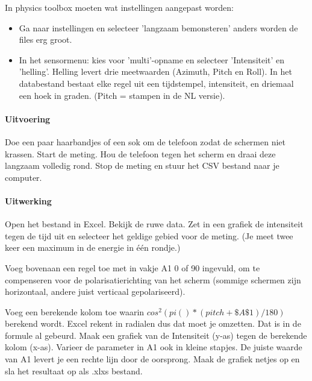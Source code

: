 \documentclass[../../main.tex]{subfiles}
\begin{document}
In physics toolbox moeten wat instellingen aangepast worden: 

\begin{itemize}[resume]
\item Ga naar instellingen en selecteer 'langzaam bemonsteren' anders worden de files erg groot.
\item In het sensormenu: kies voor 'multi'-opname en selecteer 'Intensiteit' en 'helling'. Helling levert drie meetwaarden (Azimuth, Pitch  en Roll). In het databestand bestaat elke regel uit een tijdstempel, intensiteit,  en driemaal een hoek in graden. (Pitch = stampen in de NL versie).
\end{itemize}


\paragraph{Uitvoering} Doe een paar haarbandjes of een sok om de telefoon zodat de schermen niet krassen. Start de meting. Hou de telefoon tegen het scherm en draai deze langzaam volledig rond. Stop de meting en stuur het CSV bestand naar je computer. 

\paragraph{Uitwerking}
Open het bestand in Excel. Bekijk de ruwe data. Zet in een grafiek de intensiteit tegen de tijd uit en selecteer het geldige gebied voor de meting. (Je meet twee keer een maximum in de energie in \'e\'en rondje.)
 
Voeg bovenaan een regel toe met in vakje A1 0 of 90 ingevuld, om te compenseren voor de polarisatierichting  van het scherm (sommige schermen zijn horizontaal, andere juist verticaal gepolariseerd). 

Voeg een berekende kolom toe waarin $cos^2(pi()* (pitch+\$A\$1)/180)$ berekend wordt. Excel rekent in radialen dus dat moet je omzetten. Dat is in de formule al gebeurd. Maak een grafiek van de Intensiteit (y-as) tegen de berekende kolom (x-as). Varieer de parameter in A1 ook in kleine stapjes. De juiste waarde van A1 levert je een rechte lijn door de oorsprong. Maak de grafiek netjes op en sla het resultaat op als .xlxs bestand.
\end{document}
